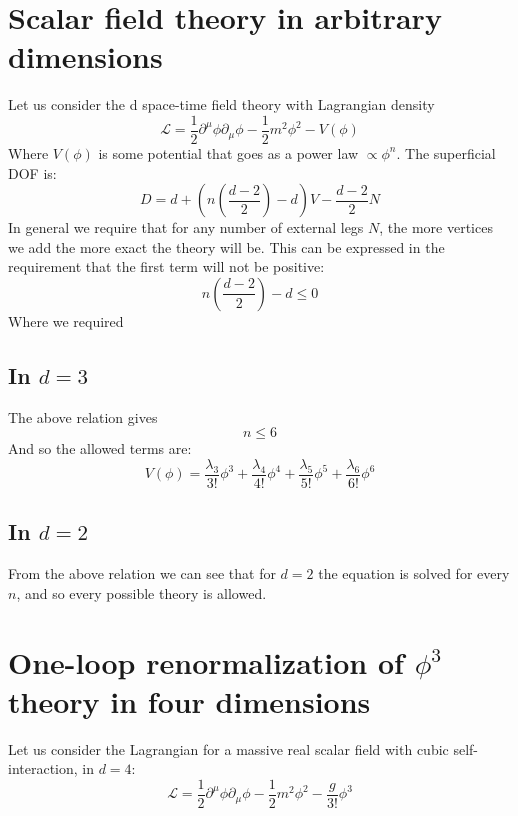 \documentclass{article}
\begin{document}
\newpage
\section{Scalar field theory in arbitrary dimensions}
Let us consider the d space-time field theory with Lagrangian density
\begin{equation}
    \mathcal{L} = \frac{1}{2}\partial^\mu\phi\partial_\mu\phi - \frac{1}{2}m^2\phi^2 - V(\phi)
\end{equation}
Where $V(\phi)$ is some potential that goes as a power law $\propto \phi^n$. The superficial DOF is:
\begin{equation}
    D = d + \left(n\left(\frac{d - 2}{2}\right) - d\right)V - \frac{d - 2}{2}N
\end{equation}
In general we require that for any number of external legs $N$, the more vertices we add the more exact the theory will be. This can be expressed in the requirement that the first term will not be positive:
\begin{equation}
    \boxed{n\left(\frac{d - 2}{2}\right) - d \le 0}
\end{equation}
Where we required 
\subsection{In $d = 3$}
The above relation gives
\begin{equation}
    n \le 6
\end{equation}
And so the allowed terms are:
\begin{equation}
    V(\phi) = \frac{\lambda_3}{3!}\phi^3 + \frac{\lambda_4}{4!}\phi^4 + \frac{\lambda_5}{5!}\phi^5 + \frac{\lambda_6}{6!}\phi^6
\end{equation}
\subsection{In $d = 2$}
From the above relation we can see that for $d = 2$ the equation is solved for every $n$, and so every possible theory is allowed.

\newpage
\section{One-loop renormalization of $\phi^3$ theory in four dimensions }
Let us consider the Lagrangian for a massive real scalar field with cubic self-interaction, in $d = 4$:
\begin{equation}
    \mathcal{L} = \frac{1}{2}\partial^\mu\phi\partial_\mu\phi - \frac{1}{2}m^2\phi^2 - \frac{g}{3!}\phi^3
\end{equation}
\end{document}
